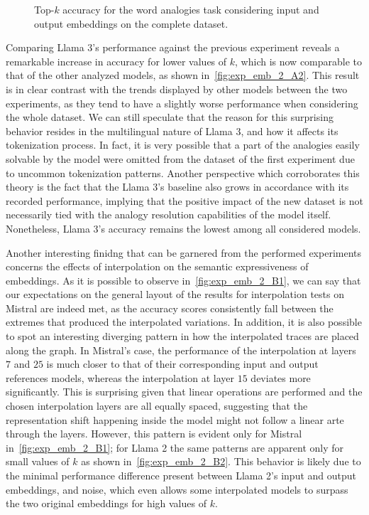 \begin{figure}[t!]
    \centering
    \caption{Top-$k$ accuracy for the word analogies task considering input and output embeddings on the complete dataset.}
    \label{fig:exp_emb_2_A}
\end{figure}

Comparing Llama 3's performance against the previous experiment reveals a remarkable increase in accuracy for lower values of $k$, which is now comparable to that of the other analyzed models, as shown in~\cref{fig:exp_emb_2_A2}.
This result is in clear contrast with the trends displayed by other models between the two experiments, as they tend to have a slightly worse performance when considering the whole dataset.
We can still speculate that the reason for this surprising behavior resides in the multilingual nature of Llama 3, and how it affects its tokenization process.
In fact, it is very possible that a part of the analogies easily solvable by the model were omitted from the dataset of the first experiment due to uncommon tokenization patterns.
Another perspective which corroborates this theory is the fact that the Llama 3's baseline also grows in accordance with its recorded performance, implying that the positive impact of the new dataset is not necessarily tied with the analogy resolution capabilities of the model itself.
Nonetheless, Llama 3's accuracy remains the lowest among all considered models. 

Another interesting finidng that can be garnered from the performed experiments concerns the effects of interpolation on the semantic expressiveness of embeddings.
As it is possible to observe in~\cref{fig:exp_emb_2_B1}, we can say that our expectations on the general layout of the results for interpolation tests on Mistral are indeed met, as the accuracy scores consistently fall between the extremes that produced the interpolated variations.
In addition, it is also possible to spot an interesting diverging pattern in how the interpolated traces are placed along the graph.
In Mistral's case, the performance of the interpolation at layers $7$ and $25$ is much closer to that of their corresponding input and output references models, whereas the interpolation at layer $15$ deviates more significantly.
This is surprising given that linear operations are performed and the chosen interpolation layers are all equally spaced, suggesting that the representation shift happening inside the model might not follow a linear arte through the layers.
However, this pattern is evident only for Mistral in~\cref{fig:exp_emb_2_B1}; for Llama 2 the same patterns are apparent only for small values of $k$ as shown in~\cref{fig:exp_emb_2_B2}.
This behavior is likely due to the minimal performance difference present between Llama 2's input and output embeddings, and noise, which even allows some interpolated models to surpass the two original embeddings for high values of $k$.

